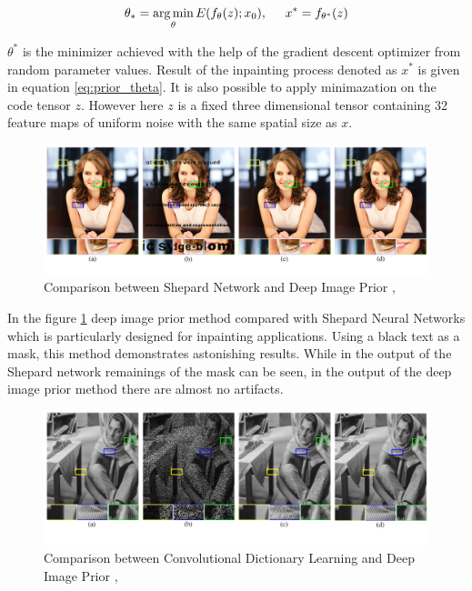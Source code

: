 \begin{equation}
    \theta_{\ast} = \operatorname*{arg\,min}_{\theta}E(f_{\theta}(z);x_{0}) , \hspace{5mm} x^{\ast} = f_{\theta^{\ast}}(z)
    \label{eq:prior_theta}
\end{equation}

\(\theta^{\ast}\) is the minimizer achieved with the help of the gradient descent optimizer from random parameter values. Result of the inpainting process denoted as \(x^{\ast}\) is given in equation \ref{eq:prior_theta}. It is also possible to apply minimazation on the code tensor \(z\). However here \(z\) is a fixed three dimensional tensor containing 32 feature maps of uniform noise with the same spatial size as \(x\).

\begin{figure}[h!]
    \centering
    \includegraphics[width=13cm]{figures/chapter4/imprior1.png}
    \caption{Comparison between Shepard Network and Deep Image Prior \cite{shepard_nn}, \cite{deep_image_prior}}
    \label{fig:prior_shepard_comparison}
\end{figure}

In the figure \ref{fig:prior_shepard_comparison} deep image prior method compared with Shepard Neural Networks \cite{shepard_nn} which is particularly designed for inpainting applications. Using a black text as a mask, this method demonstrates astonishing results. While in the output of the Shepard network remainings of the mask can be seen, in the output of the deep image prior method there are almost no artifacts.

\begin{figure}[h!]
    \centering
    \includegraphics[width=13cm]{figures/chapter4/imprior2.png}
    \caption{Comparison between Convolutional Dictionary Learning and Deep Image Prior \cite{conv_dict_learning}, \cite{deep_image_prior}}
    \label{fig:prior_dict_camparison}
\end{figure}

